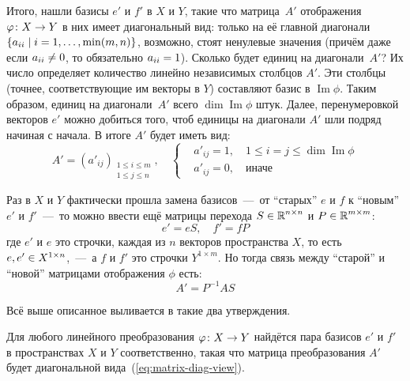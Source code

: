 \documentclass[a4paper,12pt]{article}
\DeclareMathOperator{\Imag}{Im}
\begin{document}
  Итого, нашли базисы $e'$ и $f'$ в $X$ и $Y$, такие что матрица~$A'$ отображения $\phi\colon X \hm\to Y$ в них имеет диагональный вид: только на её главной диагонали $\{a_{ii} \hm\mid i \hm= 1, \ldots, \min(m, n)\}$, возможно, стоят ненулевые значения (причём даже если $a_{ii} \hm{\not=} 0$, то обязательно $a_{ii} \hm= 1$).
  Сколько будет единиц на диагонали~$A'$?
  Их число определяет количество линейно независимых столбцов $A'$.
  Эти столбцы (точнее, соответствующие им векторы в $Y$) составляют базис в $\Imag \phi$.
  Таким образом, единиц на диагонали~$A'$ всего $\dim \Imag \phi$ штук.
  Далее, перенумеровкой векторов $e'$ можно добиться того, чтоб единицы на диагонали $A'$ шли подряд начиная с начала.
  В итоге $A'$ будет иметь вид:
  \begin{equation}\label{eq:matrix-diag-view}
    A' = (a'_{ij})_{\substack{1 \leq i \leq m\\ 1 \leq j \leq n}},\quad \left\{
      \begin{aligned}
        &a'_{ij} = 1,\quad 1 \leq i = j \leq \dim\Imag\phi\\
        &a'_{ij} = 0,\quad \mbox{иначе}
      \end{aligned}
    \right.
  \end{equation}
  
  Раз в $X$ и $Y$ фактически прошла замена базисов~---~от ``старых'' $e$ и $f$ к ``новым'' $e'$ и $f'$~---~то можно ввести ещё матрицы перехода $S \hm\in \RR^{n\times n}$ и $P \hm\in \RR^{m\times m}$:
  \[
    e' = e S,\quad f' = f P
  \]
  где $e'$ и $e$ это строчки, каждая из $n$ векторов пространства $X$, то есть $e, e' \hm\in X^{1\times n}$,~---~а $f$ и $f'$ это строчки $Y^{1\times m}$.
  Но тогда связь между ``старой'' и ``новой'' матрицами отображения $\phi$ есть:
  \begin{equation}\label{eq:matrix-change1}
    A' = P^{-1} A S
  \end{equation}
  
  Всё выше описанное выливается в такие два утверждения.
  
  \begin{theorem}
    Для любого линейного преобразования $\phi\colon X \hm\to Y$ найдётся пара базисов $e'$ и $f'$ в пространствах $X$ и $Y$ соответственно, такая что матрица преобразования $A'$ будет диагональной вида~(\ref{eq:matrix-diag-view}). 
  \end{theorem}
  
\end{document}
